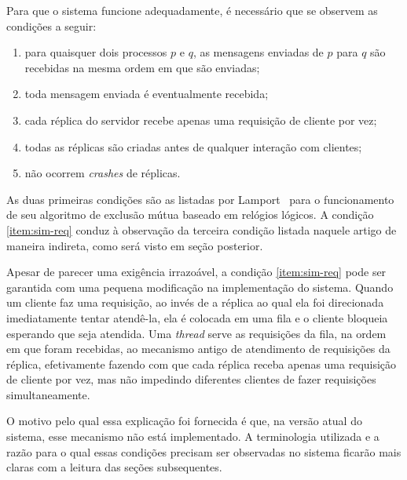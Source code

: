 \documentclass[../main.tex]{subfiles}
\begin{document}
Para que o sistema funcione adequadamente, é necessário que se observem as condições a seguir:

\begin{enumerate}
  \item
    para quaisquer dois processos $p$ e $q$, as mensagens enviadas de $p$ para $q$ são recebidas na mesma ordem em que são enviadas;

  \item
    toda mensagem enviada é eventualmente recebida;

  \item \label{item:sim-req}
    cada réplica do servidor recebe apenas uma requisição de cliente por vez;

  \item
    todas as réplicas são criadas antes de qualquer interação com clientes;

  \item
    não ocorrem \textit{crashes} de réplicas.
\end{enumerate}

As duas primeiras condições são as listadas por Lamport~\cite{lamport-logical-clocks} para o funcionamento de seu algoritmo de exclusão mútua baseado em relógios lógicos.
A condição \ref{item:sim-req} conduz à observação da terceira condição listada naquele artigo de maneira indireta, como será visto em seção posterior.

Apesar de parecer uma exigência irrazoável, a condição \ref{item:sim-req} pode ser garantida com uma pequena modificação na implementação do sistema.
Quando um cliente faz uma requisição, ao invés de a réplica ao qual ela foi direcionada imediatamente tentar atendê-la, ela é colocada em uma fila e o cliente bloqueia esperando que seja atendida.
Uma \textit{thread} serve as requisições da fila, na ordem em que foram recebidas, ao mecanismo antigo de atendimento de requisições da réplica, efetivamente fazendo com que cada réplica receba apenas uma requisição de cliente por vez, mas não impedindo diferentes clientes de fazer requisições simultaneamente.

O motivo pelo qual essa explicação foi fornecida é que, na versão atual do sistema, esse mecanismo não está implementado.
A terminologia utilizada e a razão para o qual essas condições precisam ser observadas no sistema ficarão mais claras com a leitura das seções subsequentes.
\end{document}
